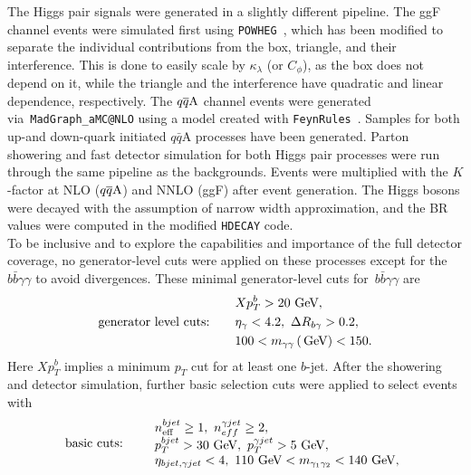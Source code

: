 The Higgs pair signals were generated in a slightly different pipeline. The ggF channel events were simulated first using \texttt{POWHEG}~\cite{Heinrich:2017kxx,Heinrich:2019bkc,Heinrich:2020ckp}, which has been modified to separate the individual contributions from the box, triangle, and their interference.  This is done to easily scale by $\kappa_\lambda$ (or $C_\phi$), as the box does not depend on it, while the triangle and the interference have quadratic and linear dependence, respectively. The $q\overline q \rm A$ channel events were generated via~\texttt{MadGraph\_aMC@NLO} using a model created with \texttt{FeynRules}~\cite{Alloul:2013bka}. Samples for both up-and down-quark initiated $q\bar q$A processes have been generated. Parton showering and fast detector simulation for both Higgs pair processes were run through the same pipeline as the backgrounds. Events were multiplied with the $K$-factor at NLO ($q\overline q \rm A$) and NNLO (ggF) after event generation. The Higgs bosons were decayed with the assumption of narrow width approximation, and the BR values were computed in the modified \texttt{HDECAY} code. 
\\
To be inclusive and to explore the capabilities and importance of the full detector coverage, no generator-level cuts were applied on these processes except for the $b\bar b \gamma\gamma$  to avoid divergences. These minimal generator-level cuts for~$b\bar b\gamma\gamma$ are
\begin{equation}
	\begin{aligned}
		& Xp_T^b>20\,\,\textrm{GeV}, \\
		\textrm{generator level cuts:}\qquad& \eta_\gamma<4.2,~ \Delta R_{b\gamma}>0.2, \\
		& 100< m_{\gamma\gamma} \,(\,\textrm{GeV}) < 150.
	\end{aligned}
\end{equation}
Here $Xp_T^b$ implies a minimum $p_T$ cut for at least one $b$-jet. 
After the showering and detector simulation, further basic selection cuts were applied to select events with
\begin{equation}
	\textrm{basic cuts:}\qquad
	\begin{array}{l}
		n_{\mathrm{eff}}^{bjet}\geq 1,~n_{eff}^{\gamma jet} \geq 2,\\
		p_T^{bjet}>30\,\,\textrm{GeV},~p_T^{\gamma jet}>5\,\,\textrm{GeV},\\
		\eta_{bjet,\gamma jet}<4,~ 110\, \,\textrm{GeV} < m_{\gamma_1\gamma_2} < 140\,\,\textrm{GeV},
	\end{array}
	\label{eqn:bcuts}
\end{equation}
